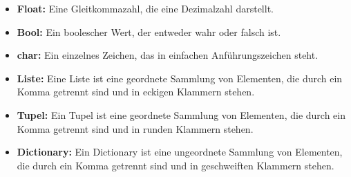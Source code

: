 \documentclass{article}
\begin{document}
\begin{itemize}
    \item \textbf{Float:} Eine Gleitkommazahl, die eine Dezimalzahl darstellt.
    \item \textbf{Bool:} Ein boolescher Wert, der entweder wahr oder falsch ist. 
    \item \textbf{char:} Ein einzelnes Zeichen, das in einfachen Anführungszeichen steht.
    \item \textbf{Liste:} Eine Liste ist eine geordnete Sammlung von Elementen, die durch ein Komma getrennt sind und in eckigen Klammern stehen.
    \item \textbf{Tupel:} Ein Tupel ist eine geordnete Sammlung von Elementen, die durch ein Komma getrennt sind und in runden Klammern stehen.
    \item \textbf{Dictionary:} Ein Dictionary ist eine ungeordnete Sammlung von Elementen, die durch ein Komma getrennt sind und in geschweiften Klammern stehen.
\end{itemize}
\end{document}
